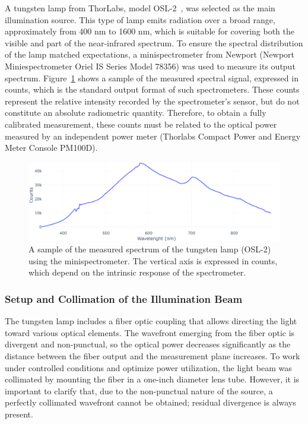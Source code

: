 \noindent A tungsten lamp from ThorLabs, model OSL-2~\cite{OSL2-Manual}, was selected as the main illumination source. This type of lamp emits radiation over a broad range, approximately from 400 nm to 1600 nm, which is suitable for covering both the visible and part of the near-infrared spectrum. To ensure the spectral distribution of the lamp matched expectations, a minispectrometer from Newport (Newport Miniespectrometer Oriel IS Series Model 78356) was used to measure its output spectrum. Figure~\ref{fig:lampara_tungsteno_espectro} shows a sample of the measured spectral signal, expressed in counts, which is the standard output format of such spectrometers. These counts represent the relative intensity recorded by the spectrometer's sensor, but do not constitute an absolute radiometric quantity. Therefore, to obtain a fully calibrated measurement, these counts must be related to the optical power measured by an independent power meter (Thorlabs Compact Power and Energy Meter Console PM100D).

\begin{figure}[h!]
    \centering
    \includegraphics[width=1\textwidth]{Figures/C3/tunsteno.png}
    \caption{A sample of the measured spectrum of the tungsten lamp (OSL-2) using the minispectrometer. The vertical axis is expressed in counts, which depend on the intrinsic response of the spectrometer.}
    \label{fig:lampara_tungsteno_espectro}
\end{figure}

\subsubsection{Setup and Collimation of the Illumination Beam}
\label{subsub:montaje_colimacion}

The tungsten lamp includes a fiber optic coupling that allows directing the light toward various optical elements. The wavefront emerging from the fiber optic is divergent and non-punctual, so the optical power decreases significantly as the distance between the fiber output and the measurement plane increases. To work under controlled conditions and optimize power utilization, the light beam was collimated by mounting the fiber in a one-inch diameter lens tube. However, it is important to clarify that, due to the non-punctual nature of the source, a perfectly collimated wavefront cannot be obtained; residual divergence is always present.

